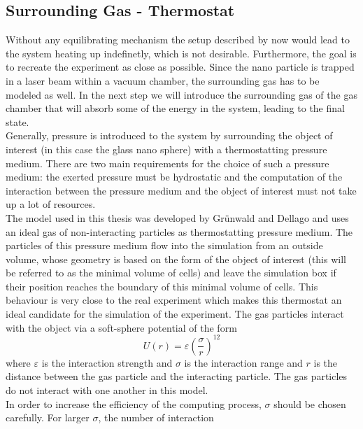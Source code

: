 \documentclass[12pt]{article}
\begin{document}
\subsection{Surrounding Gas - Thermostat}
Without any equilibrating mechanism the setup described by now would lead to the system heating up indefinetly, which is not desirable. Furthermore,
the goal is to recreate the experiment as close as possible. Since the nano particle is trapped in a laser beam within a vacuum chamber, the
surrounding gas has to be modeled as well. In the next step we will introduce the surrounding gas of the gas chamber that will absorb some of the 
energy in the system, leading to the final state.\\
Generally, pressure is introduced to the system by surrounding the object of interest (in this case the glass nano sphere) with a thermostatting
pressure medium.
There are two main requirements for the choice of such a pressure medium: the exerted pressure must be hydrostatic and the computation of the
interaction between the pressure medium and the object of interest must not take up a lot of resources.\\
The model used in this thesis was developed by Gr\"unwald and Dellago \cite{Gruenwald2006} and uses an ideal gas of non-interacting particles as
thermostatting pressure medium. The particles of this pressure medium flow into the simulation from an outside volume, whose geometry is based on the form of the
object of interest (this will be referred to as the minimal volume of cells) and leave the simulation box if their position reaches the boundary of
this minimal volume of cells. This behaviour is very close to the real experiment which makes this thermostat an ideal candidate for the simulation of
the experiment. 
The gas particles interact with the object via a soft-sphere potential of the form
\begin{equation}
    \label{eq:softsphere}
    U(r) = \varepsilon \left(\frac{\sigma}{r}\right)^{12}
\end{equation}
where $\varepsilon$ is the interaction strength and $\sigma$ is the interaction range and $r$ is the distance between the gas particle and the
interacting particle. The gas particles do not interact with one another in this model.\\
In order to increase the efficiency of the computing process, $\sigma$ should be chosen carefully. For larger $\sigma$, the number of interaction
\end{document}
